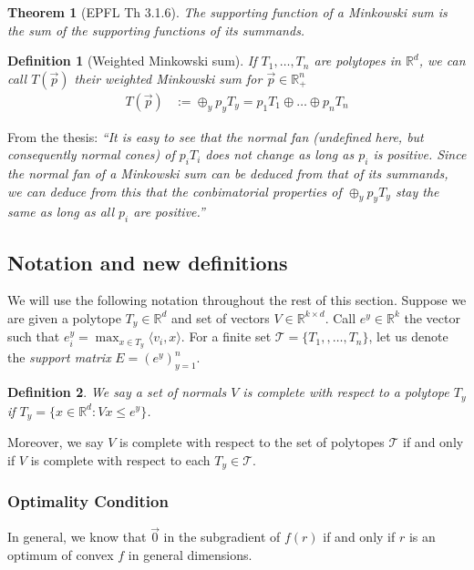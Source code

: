 \documentclass[12pt]{article}
\newcommand{\reals}{\mathbb{R}}
\newcommand{\T}{\mathcal{T}}
\newcommand{\inprod}[2]{\langle #1, #2 \rangle}%
\newtheorem{theorem}{Theorem}
\newtheorem{definition}{Definition}
\begin{document}
\begin{theorem}[EPFL Th 3.1.6]\label{thm:support-minksum}
  The supporting function of a Minkowski sum is the sum of the supporting functions of its summands.
\end{theorem}

\begin{definition}[Weighted Minkowski sum]
  If $T_1, \ldots, T_n$ are polytopes in $\reals^d$, we can call $T(\vec p)$ their \emph{weighted} Minkowski sum for $\vec p \in \reals^n_+$
  \begin{align*}
    T(\vec p) &:= \oplus_y p_y T_y = p_1 T_1 \oplus \ldots \oplus p_n T_n
  \end{align*}
\end{definition}

  From the thesis:  \emph{``It is easy to see that the normal fan (undefined here, but consequently normal cones) of $p_i T_i$ does not change as long as $p_i$ is positive.  Since the normal fan of a Minkowski sum can be deduced from that of its summands, we can deduce from this that the conbimatorial properties of $\oplus_y p_y T_y$ stay the same as long as all $p_i$ are positive.''}


  \subsection{Notation and new definitions}
  We will use the following notation throughout the rest of this section.
  Suppose we are given a polytope $T_y \in \reals^d$ and set of vectors $V \in \reals^{k \times d}$.
  Call $e^y \in \reals^k$ the vector such that $e^y_i = \max_{x \in T_y}\inprod{v_i}{x}$.  
  For a finite set $\T = \{T_1, , \ldots, T_n\}$, let us denote the \emph{support matrix} $E = (e^y)_{y=1}^n$.
  \begin{definition}
    We say a set of normals $V$ is \emph{complete} with respect to a polytope $T_y$ if $T_y = \{x \in \reals^d: Vx \leq e^y\}$.
  \end{definition}
  Moreover, we say $V$ is complete with respect to the set of polytopes $\T$ if and only if $V$ is complete with respect to each $T_y \in \T$.

  \subsubsection*{Optimality Condition}
  In general, we know that $\vec 0$ in the subgradient of $f(r)$ if and only if $r$ is an optimum of convex $f$ in general dimensions.
  
\end{document}
